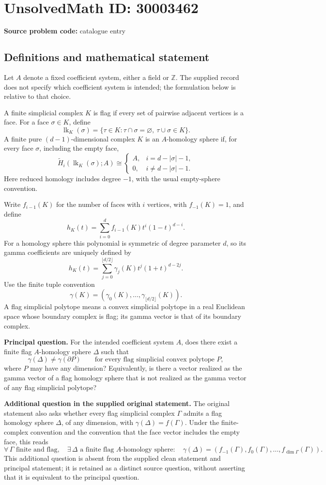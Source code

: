 \documentclass[11pt]{article}
\newcommand{\Z}{\mathbb{Z}}
\begin{document}
\section*{UnsolvedMath ID: 30003462}
\textbf{Source problem code:} catalogue entry
\subsection{Definitions and mathematical statement}
Let \(A\) denote a fixed coefficient system, either a field or \(\Z\). The supplied record does not specify which coefficient system is intended; the formulation below is relative to that choice.

A finite simplicial complex \(K\) is flag if every set of pairwise adjacent vertices is a face. For a face \(\sigma\in K\), define
\[
\operatorname{lk}_K(\sigma)=\{\tau\in K:\tau\cap\sigma=\varnothing,\ \tau\cup\sigma\in K\}.
\]
A finite pure \((d-1)\)-dimensional complex \(K\) is an \(A\)-homology sphere if, for every face \(\sigma\), including the empty face,
\[
\widetilde H_i(\operatorname{lk}_K(\sigma);A)\cong
\begin{cases}
A,&i=d-|\sigma|-1,\\
0,&i\ne d-|\sigma|-1.
\end{cases}
\]
Here reduced homology includes degree \(-1\), with the usual empty-sphere convention.

Write \(f_{i-1}(K)\) for the number of faces with \(i\) vertices, with \(f_{-1}(K)=1\), and define
\[
h_K(t)=\sum_{i=0}^{d}f_{i-1}(K)t^i(1-t)^{d-i}.
\]
For a homology sphere this polynomial is symmetric of degree parameter \(d\), so its gamma coefficients are uniquely defined by
\[
h_K(t)=\sum_{j=0}^{\lfloor d/2\rfloor}\gamma_j(K)t^j(1+t)^{d-2j}.
\]
Use the finite tuple convention
\[
\gamma(K)=(\gamma_0(K),\ldots,\gamma_{\lfloor d/2\rfloor}(K)).
\]
A flag simplicial polytope means a convex simplicial polytope in a real Euclidean space whose boundary complex is flag; its gamma vector is that of its boundary complex.

\textbf{Principal question.} For the intended coefficient system \(A\), does there exist a finite flag \(A\)-homology sphere \(\Delta\) such that
\[
\gamma(\Delta)\ne\gamma(\partial P)
\qquad\text{for every flag simplicial convex polytope }P,
\]
where \(P\) may have any dimension? Equivalently, is there a vector realized as the gamma vector of a flag homology sphere that is not realized as the gamma vector of any flag simplicial polytope?

\textbf{Additional question in the supplied original statement.} The original statement also asks whether every flag simplicial complex \(\Gamma\) admits a flag homology sphere \(\Delta\), of any dimension, with \(\gamma(\Delta)=f(\Gamma)\). Under the finite-complex convention and the convention that the face vector includes the empty face, this reads
\[
\forall\,\Gamma\text{ finite and flag},\quad
\exists\,\Delta\text{ a finite flag }A\text{-homology sphere}:\quad
\gamma(\Delta)=(f_{-1}(\Gamma),f_0(\Gamma),\ldots,f_{\dim\Gamma}(\Gamma)).
\]
This additional question is absent from the supplied clean statement and principal statement; it is retained as a distinct source question, without asserting that it is equivalent to the principal question.
\end{document}

